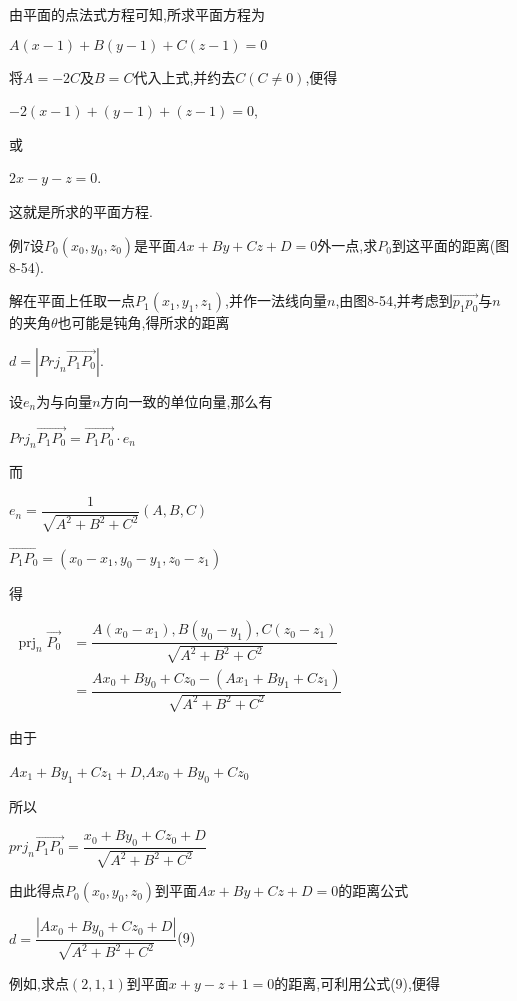 \documentclass[oneside]{book}
\begin{document}
由平面的点法式方程可知,所求平面方程为

$A(x - 1) + B(y{{ - }}1) + C(z - 1) = 0$

将$A=-2 C$及$B=C$代入上式,并约去$C(C \ne 0)$,便得

$ - 2(x - 1) + (y - 1) + (z - 1) = 0$,

或

$2x - y - z = 0$.

这就是所求的平面方程.

例7设${P_0}({x_0},{y_0},{z_0})$是平面$Ax + By + Cz + D = 0$外一点,求${P_0}$到这平面的距离(图8-54).

解在平面上任取一点${P_1}({x_1},{y_1},{z_1})$,并作一法线向量$n$,由图8-54,并考虑到$\overrightarrow {{p_1}{p_0}} $与$n$的夹角$\theta $也可能是钝角,得所求的距离

$d = |Pr j_n\overrightarrow {{P_1}{P_0}} |$.

设${e_n}$为与向量$n$方向一致的单位向量,那么有

$Pr j_n\overrightarrow {{P_1}{P_0}}  = \overrightarrow {{P_1}{P_0}}  \cdot {e_n}$

而

$e_{n}=\dfrac{1}{\sqrt{A^{2}+B^{2}+C^{2}}}(A, B, C)$

$\overrightarrow{P_{1} P_{0}}=\left(x_{0}-x_{1}, y_{0}-y_{1}, z_{0}-z_{1}\right)$

得

$\begin{aligned} \operatorname{prj}_{n} \overrightarrow{P_{0}} &=\dfrac{A\left(x_{0}-x_{1}\right), B\left(y_{0}-y_{1}\right), C\left(z_{0}-z_{1}\right)}{\sqrt{A^{2}+B^{2}+C^{2}}} \\ &=\dfrac{A x_{0}+B y_{0}+C z_{0}-\left(A x_{1}+B y_{1}+C z_{1}\right)}{\sqrt{A^{2}+B^{2}+C^{2}}} \end{aligned}$

由于

$A{x_1} + B{y_1} + C{z_1} + D$,$A{x_0} + B{y_0} + C{z_0}$

所以

${{pr}}{{{j}}_n}\overrightarrow {{P_1}{P_0}}  = \dfrac{{{x_0} + B{y_0} + C{z_0} + D}}{{\sqrt {{A^2} + {B^2} + {C^2}} }}$

由此得点${P_0}({x_0},{y_0},{z_0})$到平面$Ax + By + Cz + D = 0$的距离公式

$d = \dfrac{{|A{x_0} + B{y_0} + C{z_0} + D|}}{{\sqrt {{A^2} + {B^2} + {C^2}} }}$\quad (9)

例如,求点$(2,1,1)$到平面$x + y - z + 1 = 0$的距离,可利用公式(9),便得
\end{document}
